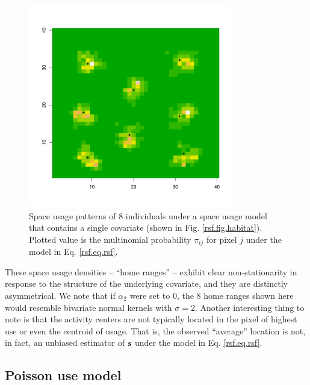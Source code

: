 \begin{figure}
\centering
\includegraphics[width=3.5in,height=3.5in]{Ch10b/figs/homeranges8}
\caption{Space usage patterns of 8 individuals under a space usage
  model that contains a single covariate (shown in
  Fig. \ref{rsf.fig.habitat}). Plotted value is the multinomial
  probability $\pi_{ij}$ for pixel $j$ under the model in Eq. \ref{rsf.eq.rsf}.
}
\label{rsf.fig.homeranges}
\end{figure}
These space usage densities -- ``home ranges'' -- exhibit clear
non-stationarity in response to the structure of the underlying
covariate, and they are distinctly asymmetrical.  We note that if
$\alpha_{2}$ were set to 0, the 8 home ranges shown here would
resemble bivariate normal kernels with $\sigma = 2$.  Another
interesting thing to note is that the activity centers are not
typically located in the pixel of highest use or even the centroid of
usage. That is, the observed ``average'' location is not, in fact, an
unbiased estimator of ${\bf s}$ under the model in
Eq. \ref{rsf.eq.rsf}. 


\subsection{Poisson use model}

